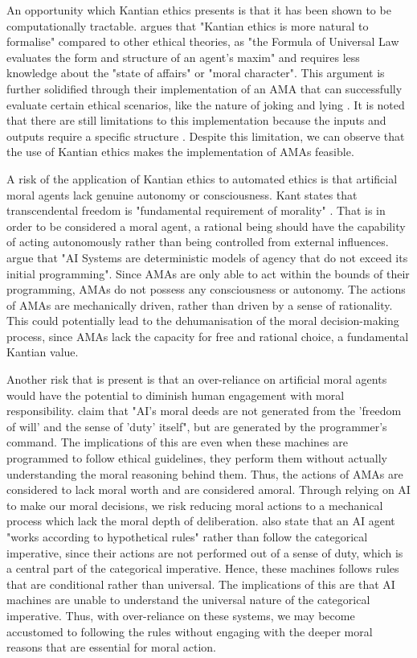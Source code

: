 \documentclass{article}
\begin{document}
An opportunity which Kantian ethics presents is that it has been shown to be computationally
tractable. \textcite[p. 16]{singh2022} argues that "Kantian ethics is more natural to formalise" compared
to other ethical theories, as "the Formula of Universal Law evaluates the form and structure of an agent's
maxim" and requires less knowledge about the "state of affairs" or "moral character". This argument is 
further solidified through their implementation of an AMA that can successfully evaluate certain
ethical scenarios, like the nature of joking and lying \parencite[6--7]{singh2022}. It is noted that
there are still limitations to this implementation because the inputs and outputs require a specific
structure \parencite[p. 10]{singh2022}. Despite this limitation, we can observe that the use of Kantian
ethics makes the implementation of AMAs feasible.

A risk of the application of Kantian ethics to automated ethics is that artificial moral agents lack
genuine autonomy or consciousness. Kant states that transcendental freedom is "fundamental requirement of morality"
\parencite[p. 142]{mannananth2021}. That is in order to be considered a moral agent, a rational being should 
have the capability of acting autonomously rather than being controlled from external influences. \textcite[p. 149]{mannananth2021}
argue that "AI Systems are deterministic models of agency that do not exceed its initial programming". Since AMAs are
only able to act within the bounds of their programming, AMAs do not possess any consciousness or autonomy. The actions
of AMAs are mechanically driven, rather than driven by a sense of rationality. This could potentially lead to the
dehumanisation of the moral decision-making process, since AMAs lack the capacity for free and rational choice, a fundamental
Kantian value.

Another risk that is present is that an over-reliance on artificial moral agents would have the potential to diminish human engagement
with moral responsibility. \textcite[p. 146]{mannananth2021} claim that "AI's moral deeds are not generated from
the 'freedom of will' and the sense of 'duty' itself", but are generated by the programmer's command. The 
implications of this are even when these machines are programmed to follow ethical guidelines, they perform
them without actually understanding the moral reasoning behind them. Thus, the actions of AMAs are considered to
lack moral worth and are considered amoral. Through relying on AI to make our moral decisions, we risk reducing moral
actions to a mechanical process which lack the moral depth of deliberation. \textcite[p. 148]{mannananth2021} also state
that an AI agent "works according to hypothetical rules" rather than follow the categorical imperative, since their
actions are not performed out of a sense of duty, which is a central part of the categorical imperative. Hence, these
machines follows rules that are conditional rather than universal. The implications of this are that AI machines are
unable to understand the universal nature of the categorical imperative. Thus, with over-reliance on these systems,
we may become accustomed to following the rules without engaging with the deeper moral reasons that are essential for moral
action. 
\end{document}
